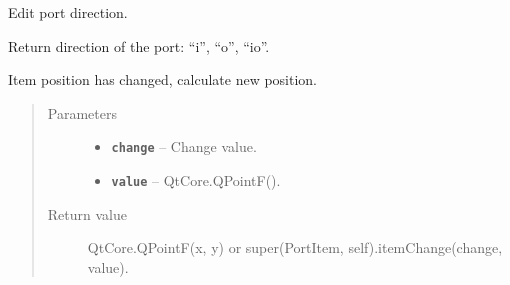 \documentclass[a4paper,10pt,english]{sphinxmanual}
\begin{document}
\begin{fulllineitems}
\begin{fulllineitems}
\begin{quote}
\begin{description}
\end{description}\end{quote}

\end{fulllineitems}


\begin{fulllineitems}
\label{model_link:model.PortItem.PortItem.editPort}
Edit port direction.

\end{fulllineitems}


\begin{fulllineitems}
\label{model_link:model.PortItem.PortItem.getDirection}
Return direction of the port: ``i'', ``o'', ``io''.

\end{fulllineitems}


\begin{fulllineitems}
\label{model_link:model.PortItem.PortItem.itemChange}
Item position has changed, calculate new position.
\begin{quote}\begin{description}
\item[{Parameters}] \leavevmode\begin{itemize}
\item {} 
\textbf{\texttt{change}} -- Change value.

\item {} 
\textbf{\texttt{value}} -- QtCore.QPointF().

\end{itemize}

\item[{Return value}] \leavevmode
QtCore.QPointF(x, y) or super(PortItem, self).itemChange(change, value).

\end{description}\end{quote}

\end{fulllineitems}



\end{fulllineitems}
\end{document}
